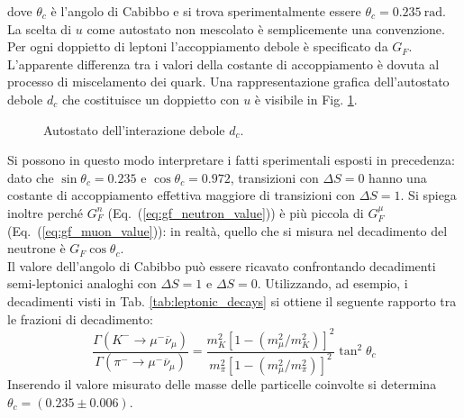 \documentclass{subnucbo}
\begin{document}
dove $\theta_{c}$ è l'angolo di Cabibbo e si trova sperimentalmente essere $\theta _ { c } = 0.235\: \mathrm { rad }$. La scelta di $u$ come autostato non mescolato è semplicemente una convenzione. Per ogni doppietto di leptoni l'accoppiamento debole è specificato da $G_{F}$. L'apparente differenza tra i valori della costante di accoppiamento è dovuta al processo di miscelamento dei quark. Una rappresentazione grafica dell'autostato debole $d_{c}$ che costituisce un doppietto con $u$ è visibile in Fig. \ref{fig:dmixing}.
\begin{figure}[t]
        \centering
        \caption{Autostato dell'interazione debole $d_{c}$.}
        \label{fig:dmixing}
\end{figure}
Si possono in questo modo interpretare i fatti sperimentali esposti in precedenza: dato che $\sin\theta_{c}=0.235$ e $\cos\theta_{c}=0.972$, transizioni con $\Delta S = 0$ hanno una costante di accoppiamento effettiva maggiore di transizioni con $\Delta S = 1$. Si spiega inoltre perché $G_{F}^{n}$ (Eq.~(\ref{eq:gf_neutron_value})) è più piccola di $G_{F}^{\mu}$ (Eq.~(\ref{eq:gf_muon_value})): in realtà, quello che si misura nel decadimento del neutrone è $G_{F}\cos \theta_{c}$. \\
Il valore dell'angolo di Cabibbo può essere ricavato confrontando decadimenti semi-leptonici analoghi con $\Delta S = 1$ e $\Delta S = 0$. Utilizzando, ad esempio, i decadimenti visti in Tab. \ref{tab:leptonic_decays} si ottiene il seguente rapporto tra le frazioni di decadimento:
\begin{equation}
        \frac { \Gamma \left( K ^ { - } \rightarrow \mu ^ { - } \overline\nu _ { \mu } \right) } { \Gamma \left( \pi ^ { - } \rightarrow \mu ^ { - } \overline \nu _ { \mu } \right) } = \frac { m _ { K } ^ { 2 } \left[ 1 - \left( m _ { \mu } ^ { 2 } / m _ { K } ^ { 2 } \right) \right] ^ { 2 } } { m _ { \pi } ^ { 2 } \left[ 1 - \left( m _ { \mu } ^ { 2 } / m _ { \pi } ^ { 2 } \right) \right] ^ { 2 } } \tan ^ { 2 } \theta _ { c }
\end{equation}
Inserendo il valore misurato delle masse delle particelle coinvolte si determina $\theta_{c} = (0.235 \pm 0.006)$.
\end{document}
